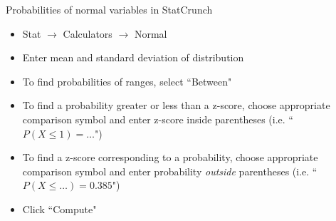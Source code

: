 \documentclass[xcolor=table]{beamer}
\begin{document}
\begin{frame}{Probabilities of normal variables in StatCrunch}
\begin{block}{}
\begin{itemize}
\item Stat $\to$ Calculators $\to$ Normal
\item Enter mean and standard deviation of distribution
\item To find probabilities of ranges, select ``Between"
\item To find a probability greater or less than a z-score, choose appropriate comparison symbol and enter z-score inside parentheses (i.e. ``$P(X \le 1) =\ldots$")
\item To find a z-score corresponding to a probability, choose appropriate comparison symbol and enter probability \emph{outside} parentheses (i.e. ``$P(X \le \ldots) = 0.385$")
\item Click ``Compute"
\end{itemize}
\end{block}
\end{frame}
\end{document}

